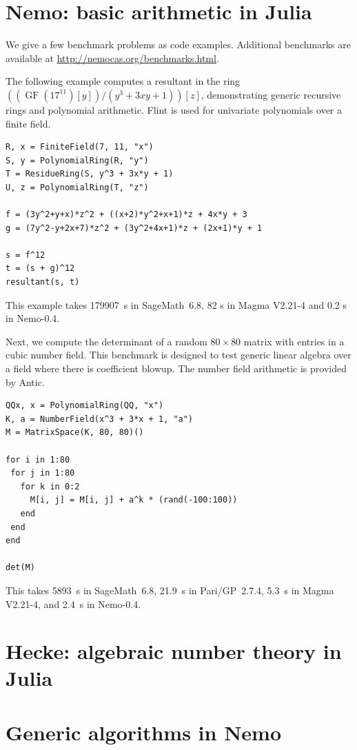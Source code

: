 \documentclass{sig-alternate-05-2015}
\begin{document}
\section{Nemo: basic arithmetic in Julia}

We give a few benchmark problems as code examples.
Additional benchmarks are available
at \url{http://nemocas.org/benchmarks.html}.

The following example computes a resultant
in the ring $((\operatorname{GF}(17^{11})[y])/(y^3 + 3xy + 1))[z]$,
demonstrating generic recursive rings and polynomial
arithmetic. Flint is used for univariate polynomials over a finite field.

\begin{verbatim}
R, x = FiniteField(7, 11, "x")
S, y = PolynomialRing(R, "y")
T = ResidueRing(S, y^3 + 3x*y + 1)
U, z = PolynomialRing(T, "z")

f = (3y^2+y+x)*z^2 + ((x+2)*y^2+x+1)*z + 4x*y + 3
g = (7y^2-y+2x+7)*z^2 + (3y^2+4x+1)*z + (2x+1)*y + 1

s = f^12
t = (s + g)^12
resultant(s, t)
\end{verbatim}

This example takes 179907~s in SageMath~6.8, 82 s in Magma V2.21-4
and 0.2 s in Nemo-0.4.

Next, we compute the determinant of a random $80\times80$ matrix
with entries in a cubic number field.
This benchmark is designed to test generic linear algebra over a field
where there is coefficient blowup. The number field arithmetic is
provided by Antic.

\begin{verbatim}
QQx, x = PolynomialRing(QQ, "x")
K, a = NumberField(x^3 + 3*x + 1, "a")
M = MatrixSpace(K, 80, 80)()

for i in 1:80
 for j in 1:80
   for k in 0:2
     M[i, j] = M[i, j] + a^k * (rand(-100:100))
   end
 end
end

det(M)
\end{verbatim}

This takes 5893~s in SageMath~6.8, 21.9~s in Pari/GP~2.7.4, 5.3~s in Magma V2.21-4,
and 2.4~s in Nemo-0.4.

\section{Hecke: algebraic number theory in Julia}

\section{Generic algorithms in Nemo}
\end{document}
